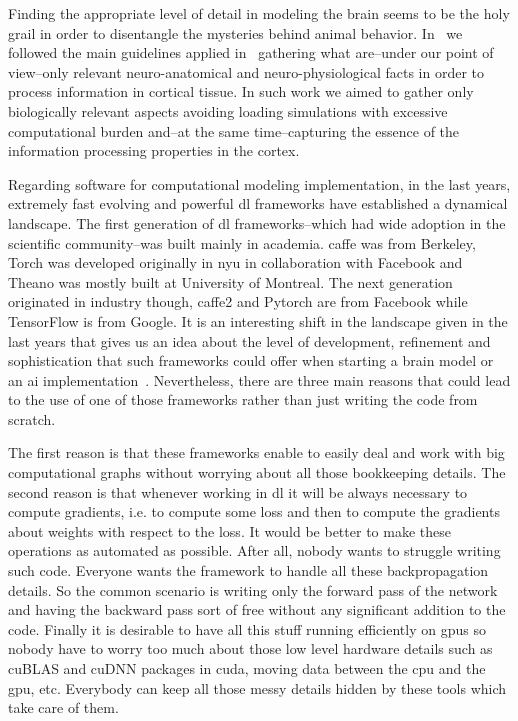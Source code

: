 \documentclass[10pt,journal,compsoc]{IEEEtran}
\begin{document}
Finding the appropriate level of detail in modeling the brain seems to be the holy grail in order to disentangle the mysteries behind animal behavior. In~\cite{Dematties2018} we followed the main guidelines applied in~\cite{10.3389/fncir.2016.00023} gathering what are--under our point of view--only relevant neuro-anatomical and neuro-physiological facts in order to process information in cortical tissue. In such work we aimed to gather only biologically relevant aspects avoiding loading simulations with excessive computational burden and--at the same time--capturing the essence of the information processing properties in the cortex.

Regarding software for computational modeling implementation, in the last years, extremely fast evolving and powerful \gls{dl} frameworks have established a dynamical landscape. The first generation of \gls{dl} frameworks--which had wide adoption in the scientific community--was built mainly in academia. \gls{caffe} was from Berkeley, Torch was developed originally in \gls{nyu} in collaboration with Facebook and Theano was mostly built at University of Montreal. The next generation originated in industry though, \gls{caffe}2 and Pytorch are from Facebook while TensorFlow is from Google. It is an interesting shift in the landscape given in the last years that gives us an idea about the level of development, refinement and sophistication that such frameworks could offer when starting a brain model or an \gls{ai} implementation~\cite{Bahrampour2015ComparativeSO,7979887}. Nevertheless, there are three main reasons that could lead to the use of one of those frameworks rather than just writing the code from scratch. 

The first reason is that these frameworks enable to easily deal and work with big computational graphs without worrying about all those bookkeeping details. The second reason is that whenever working in \gls{dl} it will be always necessary to compute gradients, i.e. to compute some loss and then to compute the gradients about weights with respect to the loss. It would be better to make these operations as automated as possible. After all, nobody wants to struggle writing such code. Everyone wants the framework to handle all these backpropagation details. So the common scenario is writing only the forward pass of the network and having the backward pass sort of free without any significant addition to the code. Finally it is desirable to have all this stuff running efficiently on \glspl{gpu} so nobody have to worry too much about those low level hardware details such as cuBLAS and cuDNN packages in \gls{cuda}, moving data between the \gls{cpu} and the \gls{gpu}, etc. Everybody can keep all those messy details hidden by these tools which take care of them.
\end{document}
